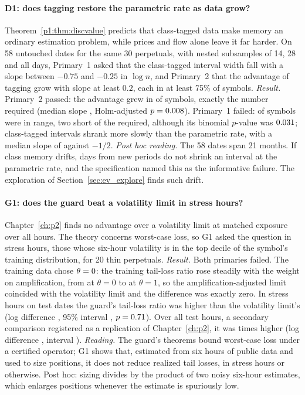 \paragraph{D1: does tagging restore the parametric rate as data grow?} Theorem~\ref{p1:thm:discvalue} predicts that class-tagged data make memory an ordinary estimation problem, while prices and flow alone leave it far harder. On 58 untouched dates for the same 30 perpetuals, with nested subsamples of 14, 28 and all days, Primary~1 asked that the class-tagged interval width fall with a slope between $-0.75$ and $-0.25$ in $\log n$, and Primary~2 that the advantage of tagging grow with slope at least $0.2$, each in at least 75\% of symbols. \emph{Result.} Primary~2 passed: the advantage grew in \DonePtwo{} of \DoneSymbols{} symbols, exactly the number required (median slope \DoneSlopeRatio{}, Holm-adjusted $p=0.008$). Primary~1 failed: \DonePone{} of \DoneSymbols{} symbols were in range, two short of the \DoneNeed{} required, although its binomial $p$-value was $0.031$; class-tagged intervals shrank more slowly than the parametric rate, with a median slope of \DoneSlopeTag{} against $-1/2$. \emph{Post hoc reading.} The 58 dates span 21 months. If class memory drifts, days from new periods do not shrink an interval at the parametric rate, and the specification named this as the informative failure. The exploration of Section~\ref{sec:ev_explore} finds such drift.

\paragraph{G1: does the guard beat a volatility limit in stress hours?} Chapter~\ref{ch:p2} finds no advantage over a volatility limit at matched exposure over all hours. The theory concerns worst-case loss, so G1 asked the question in stress hours, those whose six-hour volatility is in the top decile of the symbol's training distribution, for 20 thin perpetuals. \emph{Result.} Both primaries failed. The training data chose $\theta=0$: the training tail-loss ratio rose steadily with the weight on amplification, from \GoneThetaTLRzero{} at $\theta=0$ to \GoneThetaTLRone{} at $\theta=1$, so the amplification-adjusted limit coincided with the volatility limit and the difference was exactly zero. In \GoneStressHours{} stress hours on \GoneStressDates{} test dates the guard's tail-loss ratio was \GoneGuardPct{} higher than the volatility limit's (log difference \GoneStressGuard{}, 95\% interval \GoneStressGuardCI{}, $p=0.71$). Over all \GoneAllHours{} test hours, a secondary comparison registered as a replication of Chapter~\ref{ch:p2}, it was \GoneAllRatio{} times higher (log difference \GoneAllGuard{}, interval \GoneAllGuardCI{}). \emph{Reading.} The guard's theorems bound worst-case loss under a certified operator; G1 shows that, estimated from six hours of public data and used to size positions, it does not reduce realized tail losses, in stress hours or otherwise. Post hoc: sizing divides by the product of two noisy six-hour estimates, which enlarges positions whenever the estimate is spuriously low.

